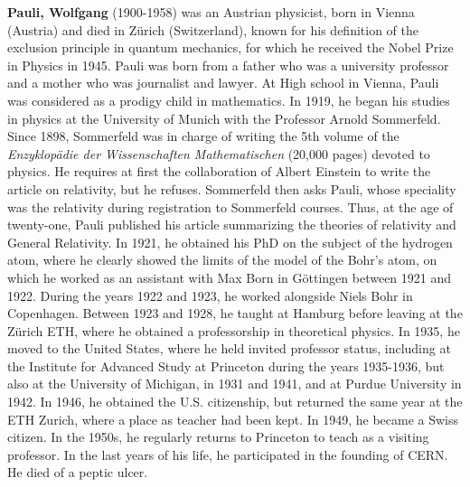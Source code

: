 \textbf{Pauli, Wolfgang} (1900-1958) was an Austrian physicist, born in Vienna (Austria) and died in Zürich (Switzerland), known for his definition of the exclusion principle in quantum mechanics, for which he received the Nobel Prize in Physics in 1945. Pauli was born from a father who was a university professor and a mother who was journalist and lawyer. At High school in Vienna, Pauli was considered as a prodigy child in mathematics. In 1919, he began his studies in physics at the University of Munich with the Professor Arnold Sommerfeld. Since 1898, Sommerfeld was in charge of writing the 5th volume of the \textit{Enzyklopädie der Wissenschaften Mathematischen} (20,000 pages) devoted to physics. He requires at first the collaboration of Albert Einstein to write the article on relativity, but he refuses. Sommerfeld then asks Pauli, whose speciality was the relativity during registration to Sommerfeld courses. Thus, at the age of twenty-one, Pauli published his article summarizing the theories of relativity and General Relativity. In 1921, he obtained his PhD on the subject of the hydrogen atom, where he clearly showed the limits of the model of the Bohr's atom, on which he worked as an assistant with Max Born in Göttingen between 1921 and 1922. During the years 1922 and 1923, he worked alongside Niels Bohr in Copenhagen. Between 1923 and 1928, he taught at Hamburg before leaving at the Zürich ETH, where he obtained a professorship in theoretical physics. In 1935, he moved to the United States, where he held invited professor status, including at the Institute for Advanced Study at Princeton during the years 1935-1936, but also at the University of Michigan, in 1931 and 1941, and at Purdue University in 1942. In 1946, he obtained the U.S. citizenship, but returned the same year at the ETH Zurich, where a place as teacher had been kept. In 1949, he became a Swiss citizen. In the 1950s, he regularly returns to Princeton to teach as a visiting professor. In the last years of his life, he participated in the founding of CERN. He died of a peptic ulcer.

